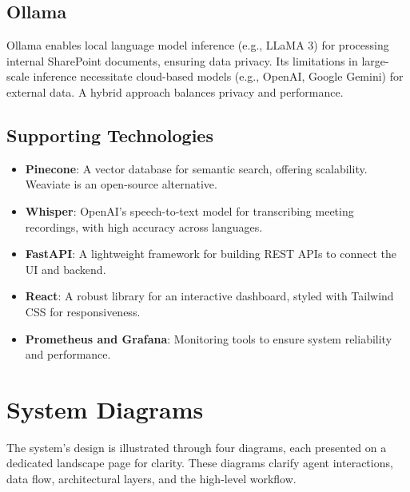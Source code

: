 \documentclass{article}
\begin{document}
\subsection{Ollama}
Ollama enables local language model inference (e.g., LLaMA 3) for processing internal SharePoint documents, ensuring data privacy. Its limitations in large-scale inference necessitate cloud-based models (e.g., OpenAI, Google Gemini) for external data. A hybrid approach balances privacy and performance.

\subsection{Supporting Technologies}
\begin{itemize}
    \item \textbf{Pinecone}: A vector database for semantic search, offering scalability. Weaviate is an open-source alternative.
    \item \textbf{Whisper}: OpenAI’s speech-to-text model for transcribing meeting recordings, with high accuracy across languages.
    \item \textbf{FastAPI}: A lightweight framework for building REST APIs to connect the UI and backend.
    \item \textbf{React}: A robust library for an interactive dashboard, styled with Tailwind CSS for responsiveness.
    \item \textbf{Prometheus and Grafana}: Monitoring tools to ensure system reliability and performance.
\end{itemize}

\section{System Diagrams}
The system’s design is illustrated through four diagrams, each presented on a dedicated landscape page for clarity. These diagrams clarify agent interactions, data flow, architectural layers, and the high-level workflow.

\end{document}
